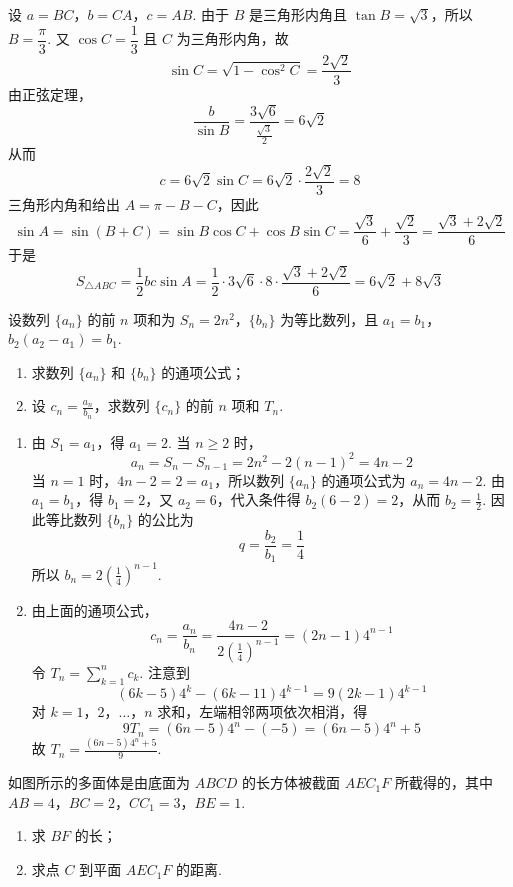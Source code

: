 \begin{solution}
设 \(a=BC\)，\(b=CA\)，\(c=AB\). 由于 \(B\) 是三角形内角且 \(\tan B=\sqrt{3}\)，所以 \(B=\dfrac{\pi}{3}\). 又 \(\cos C=\dfrac{1}{3}\) 且 \(C\) 为三角形内角，故
\[
\sin C=\sqrt{1-\cos^2C}=\frac{2\sqrt{2}}{3}
\]
由正弦定理，
\[
\frac{b}{\sin B}=\frac{3\sqrt{6}}{\frac{\sqrt{3}}{2}}=6\sqrt{2}
\]
从而
\[
c=6\sqrt{2}\sin C=6\sqrt{2}\cdot\frac{2\sqrt{2}}{3}=8
\]
三角形内角和给出 \(A=\pi-B-C\)，因此
\[
\sin A=\sin(B+C)=\sin B\cos C+\cos B\sin C
 =\frac{\sqrt{3}}{6}+\frac{\sqrt{2}}{3}
 =\frac{\sqrt{3}+2\sqrt{2}}{6}
\]
于是
\[
S_{\triangle ABC}=\frac{1}{2}bc\sin A
 =\frac{1}{2}\cdot3\sqrt{6}\cdot8\cdot\frac{\sqrt{3}+2\sqrt{2}}{6}
 =6\sqrt{2}+8\sqrt{3}
\]
\end{solution}

\begin{problem}
设数列 \(\{a_{n}\}\) 的前 \(n\) 项和为 \(S_{n} = 2n^{2}\)，\(\{b_{n}\}\) 为等比数列，且 \(a_{1} = b_{1}\)，\(b_{2}(a_{2} - a_{1}) = b_{1}\).

\begin{enumerate}
\item 求数列 \(\{a_{n}\}\) 和 \(\{b_{n}\}\) 的通项公式；
\item 设 \(c_{n} = \frac{a_{n}}{b_{n}}\)，求数列 \(\{c_{n}\}\) 的前 \(n\) 项和 \(T_{n}\).
\end{enumerate}
\end{problem}

\begin{solution}
\begin{enumerate}
\item 由 \(S_1=a_1\)，得 \(a_1=2\). 当 \(n\geqslant2\) 时，
\[
a_n=S_n-S_{n-1}=2n^2-2(n-1)^2=4n-2
\]
当 \(n=1\) 时，\(4n-2=2=a_1\)，所以数列 \(\{a_n\}\) 的通项公式为 \(a_n=4n-2\). 由 \(a_1=b_1\)，得 \(b_1=2\)，又 \(a_2=6\)，代入条件得 \(b_2(6-2)=2\)，从而 \(b_2=\frac12\). 因此等比数列 \(\{b_n\}\) 的公比为
\[
q=\frac{b_2}{b_1}=\frac14
\]
所以 \(b_n=2\left(\frac14\right)^{n-1}\).
\item 由上面的通项公式，
\[
c_n=\frac{a_n}{b_n}=\frac{4n-2}{2(\frac{1}{4})^{n-1}}=(2n-1)4^{n-1}
\]
令 \(T_n=\sum_{k=1}^{n}c_k\). 注意到
\[
(6k-5)4^k-(6k-11)4^{k-1}=9(2k-1)4^{k-1}
\]
对 \(k=1\)，\(2\)，\(\ldots\)，\(n\) 求和，左端相邻两项依次相消，得
\[
9T_n=(6n-5)4^n-(-5)=(6n-5)4^n+5
\]
故 \(T_n=\frac{(6n-5)4^n+5}{9}\).
\end{enumerate}
\end{solution}

\begin{problem}
如图所示的多面体是由底面为 \(ABCD\) 的长方体被截面 \(AEC_{1}F\) 所截得的，其中 \(AB = 4\)，\(BC = 2\)，\(CC_{1} = 3\)，\(BE = 1\).

\begin{enumerate}
\item 求 \(BF\) 的长；
\item 求点 \(C\) 到平面 \(AEC_{1}F\) 的距离.
\end{enumerate}

\end{problem}


